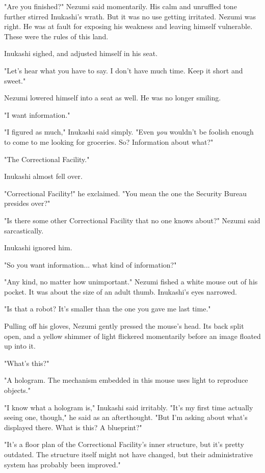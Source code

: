 "Are you finished?" Nezumi said momentarily. His calm and unruffled tone
further stirred Inukashi's wrath. But it was no use getting irritated.
Nezumi was right. He was at fault for exposing his weakness and leaving
himself vulnerable. These were the rules of this land.

Inukashi sighed, and adjusted himself in his seat.

"Let's hear what you have to say. I don't have much time. Keep it short
and sweet."

Nezumi lowered himself into a seat as well. He was no longer smiling.

\mybreak

"I want information."

"I figured as much," Inukashi said simply. "Even \emph{you} wouldn't be foolish
enough to come to me looking for groceries. So? Information about what?"

"The Correctional Facility."

Inukashi almost fell over.

"Correctional Facility!" he exclaimed. "You mean the one the Security
Bureau presides over?"

"Is there some other Correctional Facility that no one knows about?"
Nezumi said sarcastically.

Inukashi ignored him.

"So you want information... what kind of information?"

"Any kind, no matter how unimportant." Nezumi fished a white mouse out
of his pocket. It was about the size of an adult thumb. Inukashi's eyes
narrowed.

"Is that a robot? It's smaller than the one you gave me last time."

Pulling off his gloves, Nezumi gently pressed the mouse's head. Its back
split open, and a yellow shimmer of light flickered momentarily before
an image floated up into it.

"What's this?"

"A hologram. The mechanism embedded in this mouse uses light to
reproduce objects."

"I know what a hologram is," Inukashi said irritably. "It's my first
time actually seeing one, though," he said as an afterthought. "But I'm
asking about what's displayed there. What is this? A blueprint?"

"It's a floor plan of the Correctional Facility's inner structure, but
it's pretty outdated. The structure itself might not have changed, but
their administrative system has probably been improved."

